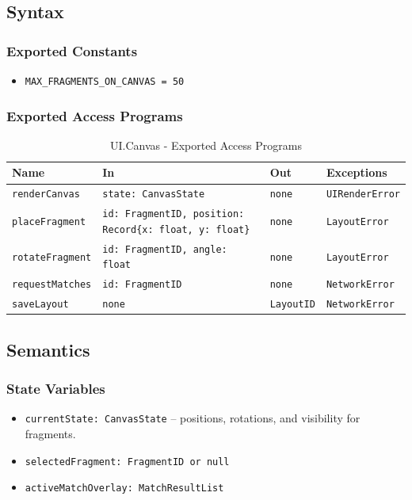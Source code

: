\documentclass[12pt, titlepage]{article}
\begin{document}
\subsection{Syntax}

\subsubsection{Exported Constants}
\begin{itemize}
    \item \texttt{MAX\_FRAGMENTS\_ON\_CANVAS = 50}
\end{itemize}

\subsubsection{Exported Access Programs}

\begin{table}[H]
\centering
\small
\caption{UI.Canvas - Exported Access Programs}
\begin{tabular}{p{3.3cm} p{3.8cm} p{2.8cm} p{4.1cm}}
\toprule
\textbf{Name} & \textbf{In} & \textbf{Out} & \textbf{Exceptions} \\
\midrule
\texttt{renderCanvas} & \texttt{state: CanvasState} & \texttt{none} & \texttt{UIRenderError} \\
\texttt{placeFragment} & \texttt{id: FragmentID, position: Record\{x: float, y: float\}} & \texttt{none} & \texttt{LayoutError} \\
\texttt{rotateFragment} & \texttt{id: FragmentID, angle: float} & \texttt{none} & \texttt{LayoutError} \\
\texttt{requestMatches} & \texttt{id: FragmentID} & \texttt{none} & \texttt{NetworkError} \\
\texttt{saveLayout} & \texttt{none} & \texttt{LayoutID} & \texttt{NetworkError} \\
\bottomrule
\end{tabular}
\end{table}

\subsection{Semantics}

\subsubsection{State Variables}
\begin{itemize}
    \item \texttt{currentState: CanvasState} – positions, rotations, and visibility for fragments.
    \item \texttt{selectedFragment: FragmentID or null}
    \item \texttt{activeMatchOverlay: MatchResultList}
\end{itemize}
\end{document}
